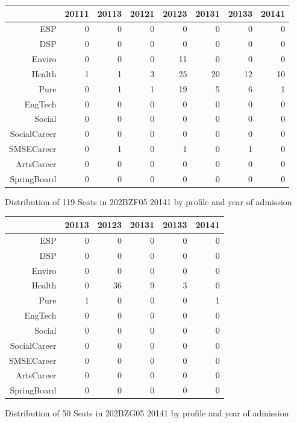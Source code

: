 \documentclass{article}\usepackage[]{graphicx}\usepackage[]{color}
\begin{document}
\begin{figure}[H]
\centering
\begin{tabular}{rrrrrrrr}
  \hline
 & 20111 & 20113 & 20121 & 20123 & 20131 & 20133 & 20141 \\ 
  \hline
ESP &   0 &   0 &   0 &   0 &   0 &   0 &   0 \\ 
  DSP &   0 &   0 &   0 &   0 &   0 &   0 &   0 \\ 
  Enviro &   0 &   0 &   0 &  11 &   0 &   0 &   0 \\ 
  Health &   1 &   1 &   3 &  25 &  20 &  12 &  10 \\ 
  Pure &   0 &   1 &   1 &  19 &   5 &   6 &   1 \\ 
  EngTech &   0 &   0 &   0 &   0 &   0 &   0 &   0 \\ 
  Social &   0 &   0 &   0 &   0 &   0 &   0 &   0 \\ 
  SocialCareer &   0 &   0 &   0 &   0 &   0 &   0 &   0 \\ 
  SMSECareer &   0 &   1 &   0 &   1 &   0 &   1 &   0 \\ 
  ArtsCareer &   0 &   0 &   0 &   0 &   0 &   0 &   0 \\ 
  SpringBoard &   0 &   0 &   0 &   0 &   0 &   0 &   0 \\ 
   \hline
\end{tabular}
\caption{Distribution of 119 Seats in 202BZF05 20141 by profile and year of admission} 
\end{figure}
\begin{figure}[H]
\centering
\begin{tabular}{rrrrrr}
  \hline
 & 20113 & 20123 & 20131 & 20133 & 20141 \\ 
  \hline
ESP &   0 &   0 &   0 &   0 &   0 \\ 
  DSP &   0 &   0 &   0 &   0 &   0 \\ 
  Enviro &   0 &   0 &   0 &   0 &   0 \\ 
  Health &   0 &  36 &   9 &   3 &   0 \\ 
  Pure &   1 &   0 &   0 &   0 &   1 \\ 
  EngTech &   0 &   0 &   0 &   0 &   0 \\ 
  Social &   0 &   0 &   0 &   0 &   0 \\ 
  SocialCareer &   0 &   0 &   0 &   0 &   0 \\ 
  SMSECareer &   0 &   0 &   0 &   0 &   0 \\ 
  ArtsCareer &   0 &   0 &   0 &   0 &   0 \\ 
  SpringBoard &   0 &   0 &   0 &   0 &   0 \\ 
   \hline
\end{tabular}
\caption{Distribution of 50 Seats in 202BZG05 20141 by profile and year of admission} 
\end{figure}
\end{document}
